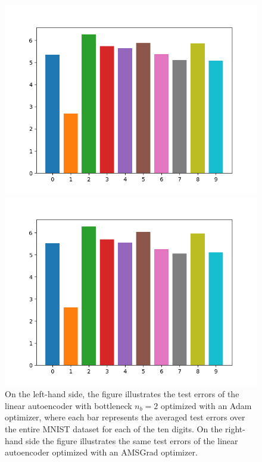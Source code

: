 \begin{figure}
\begin{center}
   \begin{minipage}[b]{0.49\linewidth}
      \includegraphics[trim = 15mm 5mm 15mm 10mm, clip, width=\linewidth]{linear_AE_2d_adam_errors}
	\end{minipage}
   \begin{minipage}[b]{0.49\linewidth}
      \includegraphics[trim = 15mm 5mm 15mm 10mm, clip, width=\linewidth]{linear_AE_2d_amsgrad_errors}
	\end{minipage}
\end{center}
\caption{On the left-hand side, the figure illustrates the test errors of the linear autoencoder with bottleneck $n_b=2$ optimized with an Adam optimizer, where each bar represents the averaged test errors over the entire MNIST dataset for each of the ten digits. On the right-hand side the figure illustrates the same test errors of the linear autoencoder optimized with an AMSGrad optimizer.}\label{fig:linear_AE_2d_errors}
\end{figure}


